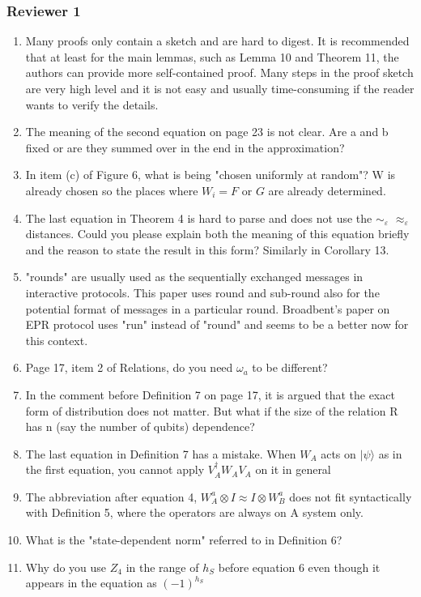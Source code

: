\documentclass[12pt]{article}
\newcommand{\eps}{\varepsilon}
\newcommand{\ket}[1]{|#1\rangle}
\begin{document}
\subsubsection*{Reviewer 1}
\begin{enumerate}
\item Many proofs only contain a sketch and are hard to digest. It is recommended that at least for the main lemmas, such as Lemma 10 and Theorem 11, the authors can provide more self-contained proof. Many steps in the proof sketch are very high level and it is not easy and usually time-consuming if the reader wants to verify the details.
\item The meaning of the second equation on page 23 is not clear. Are a and b fixed or are they summed over in the end in the approximation?
\item In item (c) of Figure 6, what is being "chosen uniformly at random"? W is already chosen so the places where $W_i = F$ or $G$ are already determined.
\item The last equation in Theorem 4 is hard to parse and does not use the $\sim_\eps$ $\approx_\eps$ distances. Could you please explain both the meaning of this equation briefly and the reason to state the result in this form? Similarly in Corollary 13.
\item "rounds" are usually used as the sequentially exchanged messages in interactive protocols. This paper uses round and sub-round also for the potential format of messages in a particular round. Broadbent's paper on EPR protocol uses "run" instead of "round" and seems to be a better now for this context.
\item Page 17, item 2 of Relations, do you need $\omega_a$ to be different?
\item In the comment before Definition 7 on page 17, it is argued that the exact form of distribution does not matter. But what if the size of the relation R has n (say the number of qubits) dependence?
\item The last equation in Definition 7 has a mistake. When $W_A$ acts on $\ket{\psi}$ as in the first equation, you cannot apply $V^\dagger_A W_A V_A$ on it in general
\item The abbreviation after equation 4, $W^a_A \otimes I \approx I \otimes W^a_B$ does not fit syntactically with Definition 5, where the operators are always on A system only.
\item What is the "state-dependent norm" referred to in Definition 6?
\item Why do you use $Z_4$ in the range of $h_S$ before equation 6 even though it appears in the equation as $(-1)^{h_S}$
\end{enumerate}
\end{document}
